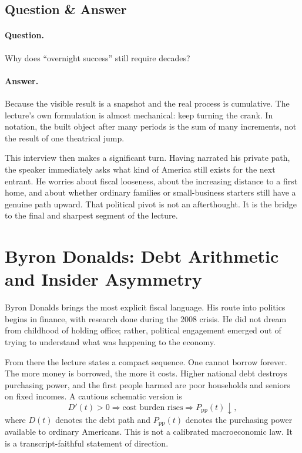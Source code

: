 \subsection{Question \& Answer}

\paragraph{Question.} Why does ``overnight success'' still require decades?

\paragraph{Answer.} Because the visible result is a snapshot and the real process is cumulative. The lecture's own formulation is almost mechanical: keep turning the crank. In notation, the built object after many periods is the sum of many increments, not the result of one theatrical jump.

This interview then makes a significant turn. Having narrated his private path, the speaker immediately asks what kind of America still exists for the next entrant. He worries about fiscal looseness, about the increasing distance to a first home, and about whether ordinary families or small-business starters still have a genuine path upward. That political pivot is not an afterthought. It is the bridge to the final and sharpest segment of the lecture.

\section{Byron Donalds: Debt Arithmetic and Insider Asymmetry}

Byron Donalds brings the most explicit fiscal language. His route into politics begins in finance, with research done during the 2008 crisis. He did not dream from childhood of holding office; rather, political engagement emerged out of trying to understand what was happening to the economy.

From there the lecture states a compact sequence. One cannot borrow forever. The more money is borrowed, the more it costs. Higher national debt destroys purchasing power, and the first people harmed are poor households and seniors on fixed incomes. A cautious schematic version is
\begin{equation}
D'(t)>0 \Rightarrow \text{cost burden rises} \Rightarrow P_{\text{pp}}(t)\downarrow,
\end{equation}
where $D(t)$ denotes the debt path and $P_{\text{pp}}(t)$ denotes the purchasing power available to ordinary Americans. This is not a calibrated macroeconomic law. It is a transcript-faithful statement of direction.

